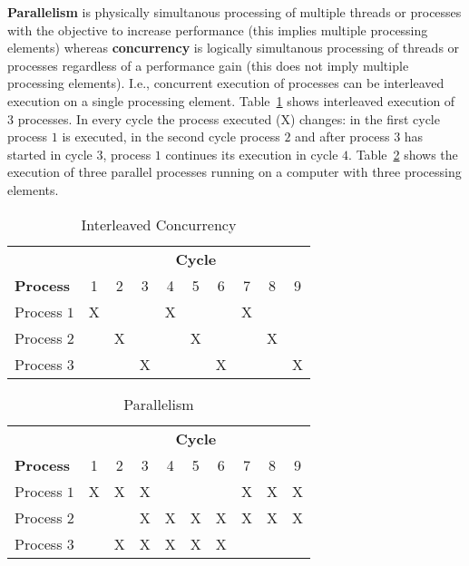\textbf{Parallelism} is physically simultanous processing of multiple
threads or processes with the objective
to increase performance (this implies multiple processing elements)
whereas \textbf{concurrency} is logically simultanous processing of
threads or processes regardless of a performance gain (this does not
imply multiple processing elements). I.e., concurrent execution of
processes can be interleaved execution on a single processing
element. Table~\ref{tab:concurrency} shows interleaved execution of 3
processes. In every cycle the process executed (X) changes: in the
first cycle process $1$ is executed, in the second cycle process $2$
and after process $3$ has started in cycle $3$, process $1$ continues
its execution in cycle $4$. Table~\ref{tab:parallelism} shows the
execution of three parallel processes running on a computer with three
processing elements. 

\begin{table}[h!b!p!]
\caption{Interleaved Concurrency}
\centering
\begin{tabular}{|l|c|c|c|c|c|c|c|c|c|}
\hline
 & \multicolumn{9}{|c|}{\textbf{Cycle}} \\
\textbf{Process}
	& 1
	& 2
	& 3
        & 4
        & 5
        & 6
        & 7
        & 8
        & 9
        \\ \hline 
Process $1$ & X &   &   & X &   &   & X &   &   \\ \hline
Process $2$ &   & X &   &   & X &   &   & X &   \\ \hline
Process $3$ &   &   & X &   &   & X &   &   & X \\ \hline
\end{tabular}
\label{tab:concurrency}
\end{table}

\begin{table}[h!b!p!]
\caption{Parallelism}
\centering
\begin{tabular}{|l|c|c|c|c|c|c|c|c|c|}
\hline
 & \multicolumn{9}{|c|}{\textbf{Cycle}} \\
\textbf{Process}
	& 1
	& 2
	& 3
        & 4
        & 5
        & 6
        & 7
        & 8
        & 9
        \\ \hline 
Process $1$ & X & X & X &   &   &   & X & X & X \\ \hline
Process $2$ &   &   & X & X & X & X & X & X & X \\ \hline
Process $3$ &   & X & X & X & X & X &   &   &   \\ \hline
\end{tabular}
\label{tab:parallelism}
\end{table}

